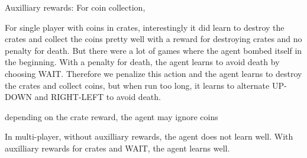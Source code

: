
Auxilliary rewards:
For coin collection, 


For single player with coins in crates, interestingly it did learn to destroy the crates and collect the coins pretty well with a reward for destroying crates and no penalty for death. But there were a lot of games where the agent bombed itself in the beginning.
With a penalty for death, the agent learns to avoid death by choosing WAIT. Therefore we penalize this action and the agent learns to destroy the crates and collect coins, but when run too long, it learns to alternate UP-DOWN and RIGHT-LEFT to avoid death.

depending on the crate reward, the agent may ignore coins

In multi-player, without auxilliary rewards, the agent does not learn well.
With auxilliary rewards for crates and WAIT, the agent learns well.
